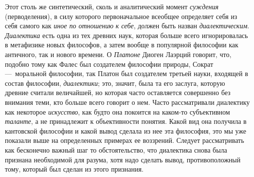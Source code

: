 \documentclass[twoside]{article}
\begin{document}
Этот столь же синтетический, сколь и аналитический момент
{\em суждения}
(перводеления), в силу которого первоначальное всеобщее
определяет себя из себя самого как
{\em иное по отношению}
{\em к себе}, должен быть
назван {\em диалектическим}.
{\em Диалектика} есть одна
из тех древних наук, которая больше всего игнорировалась в метафизике новых
философов, а затем вообще в популярной философии как античного, так и
нового времени. О {\em Платоне}
Диоген Лаэрций говорит, что, подобно тому как Фалес был
создателем философии природы, Сократ —~моральной философии,
так Платон был создателем третьей науки, входящей в состав философии,
{\em диалектики}; это,
значит, была та его заслуга, которую древние считали величайшей, но которая
часто оставляется совершенно без внимания теми, кто больше всего говорит о
нем. Часто рассматривали диалектику как некоторое
{\em искусство}, как
будто она покоится на каком-то субъективном
{\em таланте}, а не
принадлежит к объективности понятия. Какой вид она получила в кантовской
философии и какой вывод сделала из нее эта философия, это мы уже показали
выше на определенных примерах ее воззрений. Следует рассматривать как
бесконечно важный шаг то обстоятельство, что диалектика снова была признана
необходимой для разума, хотя надо сделать вывод, противоположный тому,
который был сделан из этого признания.
\end{document}
